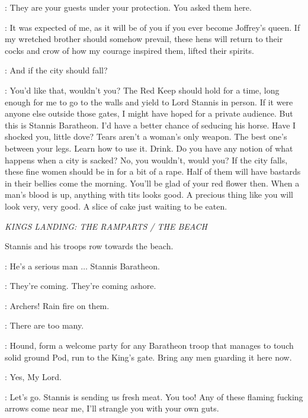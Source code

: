 \SANSA: They are your guests under your protection. You asked them here. 

\CERSEI: It was expected of me, as it will be of you if you ever become Joffrey's queen. If my wretched brother should somehow prevail, these hens will return to their cocks and crow of how my courage inspired them, lifted their spirits. 

\SANSA: And if the city should fall? 

\CERSEI: You'd like that, wouldn't you? The Red Keep should hold for a time, long enough for me to go to the walls and yield to Lord Stannis in person. If it were anyone else outside those gates, I might have hoped for a private audience. But this is Stannis Baratheon. I'd have a better chance of seducing his horse. Have I shocked you, little dove? Tears aren't a woman's only weapon. The best one's between your legs. Learn how to use it. Drink. Do you have any notion of what happens when a city is sacked? No, you wouldn't, would you? If the city falls, these fine women should be in for a bit of a rape. Half of them will have bastards in their bellies come the morning. You'll be glad of your red flower then. When a man's blood is up, anything with tits looks good. A precious thing like you will look very, very good. A slice of cake just waiting to be eaten. 

\scene

\textit{KINGS LANDING: THE RAMPARTS / THE BEACH}


\n Stannis and his troops row towards the beach.

\TYRION: He's a serious man $\ldots$ Stannis Baratheon. 

\JOFFREY: They're coming. They're coming ashore. 

\TYRION: Archers! Rain fire on them. 

\JOFFREY: There are too many. 

\TYRION: Hound, form a welcome party for any Baratheon troop that manages to touch solid ground  Pod, run to the King's gate. Bring any men guarding it here now. 

\PODRICK: Yes, My Lord. 

\HOUND: Let's go. Stannis is sending us fresh meat.  You too!  Any of these flaming fucking arrows come near me, I'll strangle you with your own guts. 

